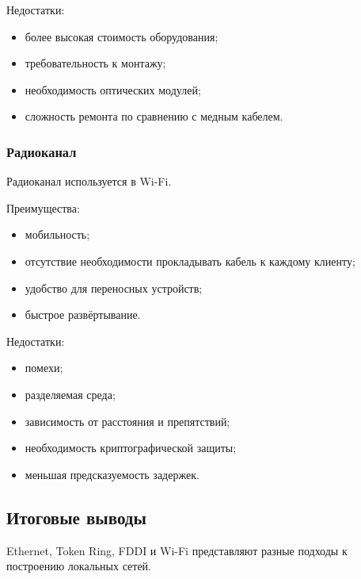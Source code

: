 \documentclass[12pt,a4paper]{article}
\begin{document}
Недостатки:
\begin{itemize}
    \item более высокая стоимость оборудования;
    \item требовательность к монтажу;
    \item необходимость оптических модулей;
    \item сложность ремонта по сравнению с медным кабелем.
\end{itemize}

\subsubsection{Радиоканал}

Радиоканал используется в Wi-Fi.

Преимущества:
\begin{itemize}
    \item мобильность;
    \item отсутствие необходимости прокладывать кабель к каждому клиенту;
    \item удобство для переносных устройств;
    \item быстрое развёртывание.
\end{itemize}

Недостатки:
\begin{itemize}
    \item помехи;
    \item разделяемая среда;
    \item зависимость от расстояния и препятствий;
    \item необходимость криптографической защиты;
    \item меньшая предсказуемость задержек.
\end{itemize}

\subsection{Итоговые выводы}

Ethernet, Token Ring, FDDI и Wi-Fi представляют разные подходы к построению локальных сетей.
\end{document}
